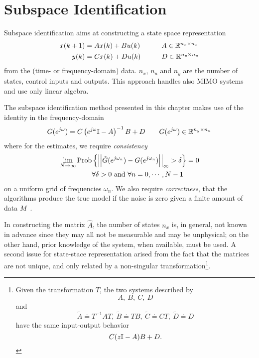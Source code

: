 \chapter{Subspace Identification}
\label{chap:subspace-identification}

Subspace identification aims at constructing a state space representation
\begin{equation}
  \label{eq:state-space-representation}
  \begin{aligned}
    x(k+1) &= Ax(k) + Bu(k) & \hspace{2em} & A \in \mathbb{R}^{n_x\times n_x} \\
    y(k) &= Cx(k) + Du(k) & & D \in \mathbb{R}^{n_y\times n_u}
  \end{aligned}
\end{equation}
from the (time- or frequency-domain) data. $n_x$, $n_u$ and $n_y$ are the number of states, control inputs and outputs. This approach handles also MIMO systems and use only linear algebra.

The subspace identification method presented in this chapter makes use of the identity in the frequency-domain
\begin{equation*}
  G(e^{j\omega}) = C\left(e^{j\omega} \mathbb{I} - A\right)^{-1}B + D\hspace{2em} G(e^{j\omega}) \in \mathbb{R}^{n_y\times n_u}
\end{equation*}
where for the estimates, we require \emph{consistency}
\begin{equation*}
  \begin{aligned}
    \lim_{N\rightarrow \infty} \text{Prob} & \left\{\left|\left|\hat{G}(e^{j\omega_n}) - G(e^{j\omega_n}) \right|\right|_\infty > \delta\right\} = 0 \\
                                           & \forall \delta>0 \text{ and } \forall n=0,\cdots,N-1
  \end{aligned}
\end{equation*}
on a uniform grid of frequencies $\omega_n$. We also require \emph{correctness}, that the algorithms produce the true model if the noise is zero given a finite amount of data $M$~\cite{mckelvey}.

In constructing the matrix $\hat{A}$, the number of states $n_x$ is, in general, not known in advance since they may all not be measurable and may be unphysical; on the other hand, prior knowledge of the system, when available, must be used. A second issue for state-stace representation arised from the fact that the matrices are not unique, and only related by a non-singular transformation\footnote{Given the transformation $T$, the two systems described by
  \begin{equation*}
    A,\ B,\ C,\ D
  \end{equation*}
  and
  \begin{equation*}
    \tilde{A}\doteq T^{-1}AT,\ \tilde{B}\doteq TB,\ \tilde{C}\doteq CT,\ \tilde{D}\doteq D
  \end{equation*}
  have the same input-output behavior
  \begin{equation*}
    C(z\mathbb{I} - A)B + D.
  \end{equation*}}.

